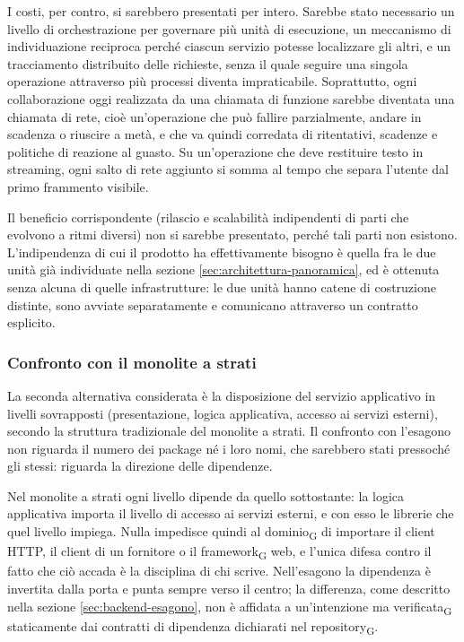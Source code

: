 \documentclass[a4paper, 10pt]{article}
\begin{document}
I costi, per contro, si sarebbero presentati per intero. Sarebbe stato necessario un livello di orchestrazione per governare più unità di esecuzione, un meccanismo di individuazione reciproca perché ciascun servizio potesse localizzare gli altri, e un tracciamento distribuito delle richieste, senza il quale seguire una singola operazione attraverso più processi diventa impraticabile. Soprattutto, ogni collaborazione oggi realizzata da una chiamata di funzione sarebbe diventata una chiamata di rete, cioè un'operazione che può fallire parzialmente, andare in scadenza o riuscire a metà, e che va quindi corredata di ritentativi, scadenze e politiche di reazione al guasto. Su un'operazione che deve restituire testo in streaming, ogni salto di rete aggiunto si somma al tempo che separa l'utente dal primo frammento visibile.

Il beneficio corrispondente (rilascio e scalabilità indipendenti di parti che evolvono a ritmi diversi) non si sarebbe presentato, perché tali parti non esistono. L'indipendenza di cui il prodotto ha effettivamente bisogno è quella fra le due unità già individuate nella sezione \ref{sec:architettura-panoramica}, ed è ottenuta senza alcuna di quelle infrastrutture: le due unità hanno catene di costruzione distinte, sono avviate separatamente e comunicano attraverso un contratto esplicito.


\subsubsection{Confronto con il monolite a strati}
\label{sec:confronto-monolite}
La seconda alternativa considerata è la disposizione del servizio applicativo in livelli sovrapposti (presentazione, logica applicativa, accesso ai servizi esterni), secondo la struttura tradizionale del monolite a strati. Il confronto con l'esagono non riguarda il numero dei package né i loro nomi, che sarebbero stati pressoché gli stessi: riguarda la direzione delle dipendenze.

Nel monolite a strati ogni livello dipende da quello sottostante: la logica applicativa importa il livello di accesso ai servizi esterni, e con esso le librerie che quel livello impiega. Nulla impedisce quindi al dominio\textsubscript{G} di importare il client HTTP, il client di un fornitore o il framework\textsubscript{G} web, e l'unica difesa contro il fatto che ciò accada è la disciplina di chi scrive. Nell'esagono la dipendenza è invertita dalla porta e punta sempre verso il centro; la differenza, come descritto nella sezione \ref{sec:backend-esagono}, non è affidata a un'intenzione ma verificata\textsubscript{G} staticamente dai contratti di dipendenza dichiarati nel repository\textsubscript{G}.
\end{document}
